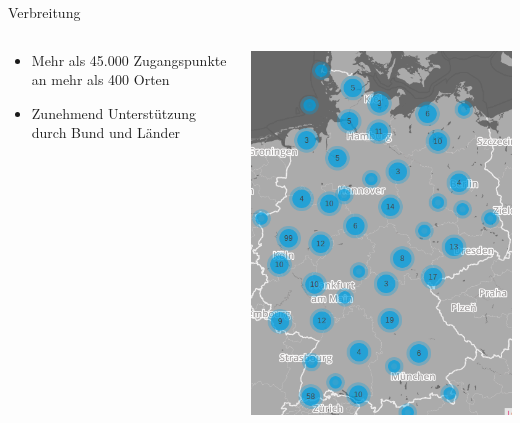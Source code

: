 \documentclass[t]{beamer}
\begin{document}
  \begin{frame}{Verbreitung}
    \begin{columns}
      \begin{column}{0.6\textwidth}
  \begin{itemize}
    \item Mehr als 45.000 Zugangspunkte an mehr als 400 Orten
    \item Zunehmend Unterstützung durch Bund und Länder
  \end{itemize}
      \end{column}
      \begin{column}{0.4\textwidth}
  \begin{center}
    \includegraphics[width=\textwidth]{Bilder/community-map-2017-04-24}
  \end{center}
      \end{column}
    \end{columns}
  \end{frame}
  
\end{document}
